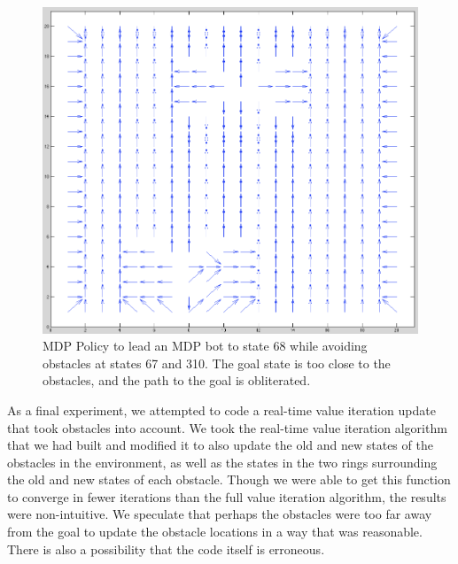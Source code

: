 \documentclass{aiaa-tc}%
\begin{document}
 \begin{figure}[htbp]
   \centering
   \includegraphics[width=170mm]{mdp_proximity_error.png} 
   \caption{MDP Policy to lead an MDP bot to state 68 while avoiding obstacles at states 67 and 310. The goal state is too close to the obstacles, and the path to the goal is obliterated.}
   \label{fig:sample}
\end{figure}

\clearpage
\noindent
As a final experiment, we attempted to code a real-time value iteration update that took obstacles into account. We took the real-time value iteration algorithm that we had built and modified it to also update the old and new states of the obstacles in the environment, as well as the states in the two rings surrounding the old and new states of each obstacle. Though we were able to get this function to converge in fewer iterations than the full value iteration algorithm, the results were non-intuitive. We speculate that perhaps the obstacles were too far away from the goal to update the obstacle locations in a way that was reasonable. There is also a possibility that the code itself is erroneous.
\end{document}
